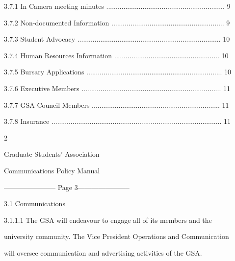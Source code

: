    3.7.1   In Camera meeting minutes .............................................................. 9  



   3.7.2   Non-documented Information ........................................................... 9  



   3.7.3   Student Advocacy ........................................................................... 10  



   3.7.4   Human Resources Information ....................................................... 10  



   3.7.5   Bursary Applications ....................................................................... 10  



   3.7.6   Executive Members ......................................................................... 11  



   3.7.7   GSA Council Members ................................................................... 11  



   3.7.8   Insurance ......................................................................................... 11  



  

  

                                                             2  

                                           

                                         Graduate Students’ Association  

                                         Communications Policy Manual  

  


----------------------- Page 3-----------------------

                                 3.1     Communications   

  

3.1.1.1           The  GSA  will  endeavour  to  engage  all  of  its  members  and  the  

         university community. The Vice President Operations and  Communication  

         will oversee communication and advertising activities of the GSA.   

